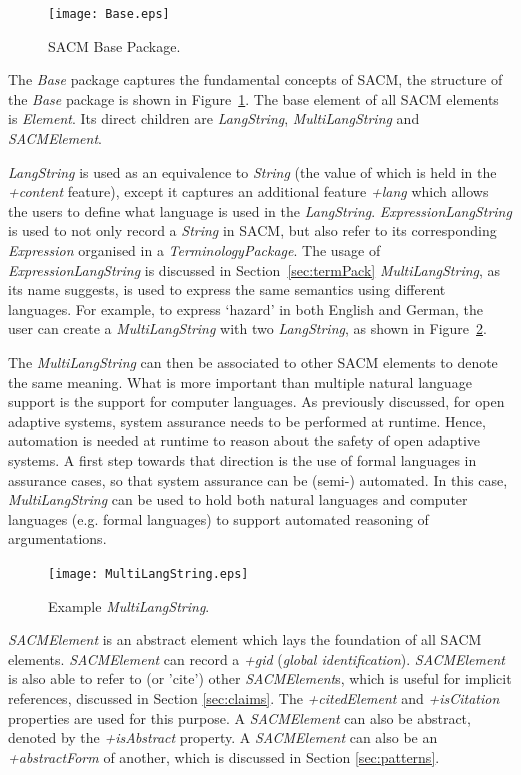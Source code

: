 \begin{figure}[ht!]
	\centering
	\texttt{[image: Base.eps]}
	\caption{SACM Base Package.}
	\label{fig:base}
\end{figure}
The \textit{Base} package captures the fundamental concepts of SACM, the structure of the \textit{Base} package is shown in Figure~\ref{fig:base}. 
The base element of all SACM elements is \textit{Element}. 
Its direct children are \textit{LangString}, \textit{MultiLangString} and \textit{SACMElement}.

\textit{LangString} is used as an equivalence to \textit{String} (the value of which is held in the \textit{+content} feature), except it captures an additional feature \textit{+lang} which allows the users to define what language is used in the \textit{LangString}. 
\textit{ExpressionLangString} is used to not only record a \textit{String} in SACM, but also refer to its corresponding \textit{Expression} organised in a \textit{TerminologyPackage}. 
The usage of \textit{ExpressionLangString} is discussed in Section~\ref{sec:termPack} \textit{MultiLangString}, as its name suggests, is used to express the same semantics using different languages. 
For example, to express `hazard' in both English and German, the user can create a \textit{MultiLangString} with two \textit{LangString}, as shown in Figure~\ref{fig:mulitiLang}.

The \textit{MultiLangString} can then be associated to other SACM elements to denote the same meaning. 
What is more important than multiple natural language support is the support for computer languages. 
As previously discussed, for open adaptive systems, system assurance needs to be performed at runtime. 
Hence, automation is needed at runtime to reason about the safety of open adaptive systems. 
A first step towards that direction is the use of formal languages in assurance cases, so that system assurance can be (semi-) automated. In this case, \textit{MultiLangString} can be used to hold both natural languages and computer languages (e.g. formal languages) to support automated reasoning of argumentations. 

\begin{figure}
	\centering
	\texttt{[image: MultiLangString.eps]}
	\caption{Example \textit{MultiLangString}.}
	\label{fig:mulitiLang}
\end{figure}

\textit{SACMElement} is an abstract element which lays the foundation of all SACM elements. \textit{SACMElement} can record a \textit{+gid} (\textit{global identification}). 
\textit{SACMElement} is also able to refer to (or 'cite') other \textit{SACMElement}s, which is useful for implicit references, discussed in Section \ref{sec:claims}. 
The \textit{+citedElement} and \textit{+isCitation} properties are used for this purpose. 
A \textit{SACMElement} can also be abstract, denoted by the \textit{+isAbstract} property. 
A \textit{SACMElement} can also be an \textit{+abstractForm} of another, which is discussed in Section \ref{sec:patterns}. 

